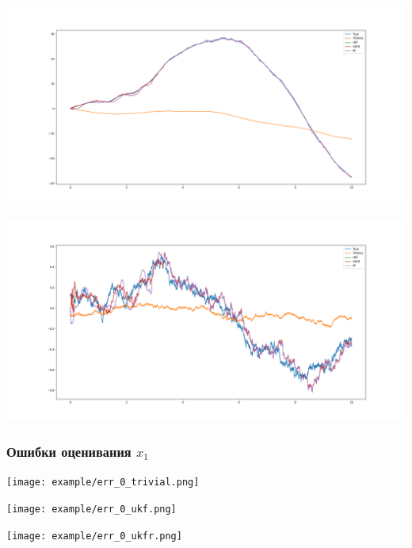 \documentclass[12pt]{article}
\begin{document}
\begin{landscape}
	\includegraphics[width=1.0\linewidth]{example/estimate_2.png}\newpage
\end{landscape}

\begin{landscape}
	\includegraphics[width=1.0\linewidth]{example/estimate_3.png}\newpage
\end{landscape}

\newpage

\begin{landscape}
	\subsubsection{Ошибки оценивания $x_1$}
	\texttt{[image: example/err\_0\_trivial.png]}\newpage
\end{landscape}

\begin{landscape}
	\texttt{[image: example/err\_0\_ukf.png]}\newpage
\end{landscape}

\begin{landscape}
	\texttt{[image: example/err\_0\_ukfr.png]}\newpage
\end{landscape}
\end{document}
